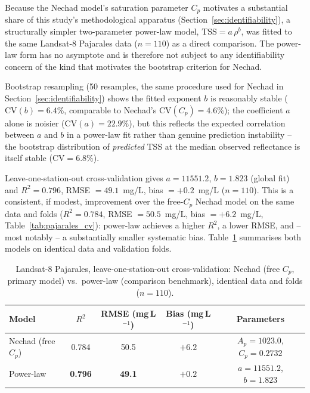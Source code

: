 \documentclass[remotesensing,article,submit,pdftex,moreauthors]{Definitions/mdpi}
\begin{document}
Because the Nechad model's saturation parameter $C_p$ motivates a
substantial share of this study's methodological apparatus
(Section~\ref{sec:identifiability}), a structurally simpler two-parameter
power-law model, $\text{TSS} = a\,\rho^b$, was fitted to the same
Landsat-8 Pajarales data ($n=110$) as a direct comparison. The
power-law form has no asymptote and is therefore not subject to any
identifiability concern of the kind that motivates the bootstrap
criterion for Nechad.

Bootstrap resampling (50 resamples, the same procedure used for Nechad
in Section~\ref{sec:identifiability}) shows the fitted exponent $b$ is
reasonably stable ($\mathrm{CV}(b) = 6.4\%$, comparable to Nechad's
$\mathrm{CV}(C_p) = 4.6\%$); the coefficient $a$ alone is noisier
($\mathrm{CV}(a) = 22.9\%$), but this reflects the expected correlation
between $a$ and $b$ in a power-law fit rather than genuine prediction
instability -- the bootstrap distribution of \emph{predicted} TSS at
the median observed reflectance is itself stable
($\mathrm{CV} = 6.8\%$).

Leave-one-station-out cross-validation gives $a = 11551.2$,
$b = 1.823$ (global fit) and $R^2 = 0.796$, RMSE $= 49.1$~mg/L,
bias $= +0.2$~mg/L ($n=110$). This is a consistent, if modest,
improvement over the free-$C_p$ Nechad model on the same data and
folds ($R^2 = 0.784$, RMSE $= 50.5$~mg/L, bias $= +6.2$~mg/L,
Table~\ref{tab:pajarales_cv}): power-law achieves a higher $R^2$, a
lower RMSE, and -- most notably -- a substantially smaller systematic
bias. Table~\ref{tab:powerlaw} summarises both models on identical
data and validation folds.

\begin{table}[ht]
\centering
\caption{Landsat-8 Pajarales, leave-one-station-out cross-validation:
Nechad (free $C_p$, primary model) vs.\ power-law (comparison
benchmark), identical data and folds ($n=110$).}
\label{tab:powerlaw}
\small
\begin{tabular}{lcccc}
\toprule
Model & $R^2$ & RMSE (mg\,L$^{-1}$) & Bias (mg\,L$^{-1}$) & Parameters \\
\midrule
Nechad (free $C_p$) & 0.784 & 50.5 & $+6.2$ & $A_p=1023.0$, $C_p=0.2732$ \\
Power-law           & \textbf{0.796} & \textbf{49.1} & \textbf{$+0.2$} & $a=11551.2$, $b=1.823$ \\
\bottomrule
\end{tabular}
\end{table}
\end{document}
